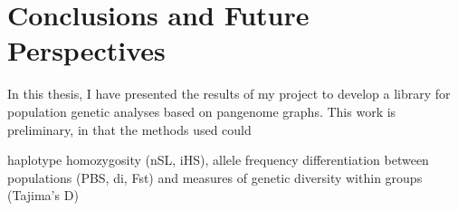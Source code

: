 
\chapter{Conclusions and Future Perspectives }%

\label{Chapter6} %




In this thesis, I have presented the results of my project to develop a library for population genetic analyses based on pangenome graphs.
This work is preliminary, in that the methods used could 

haplotype homozygosity (nSL, iHS), allele
frequency differentiation between populations (PBS, di, Fst) and measures of genetic
diversity within groups (Tajima’s D)
 